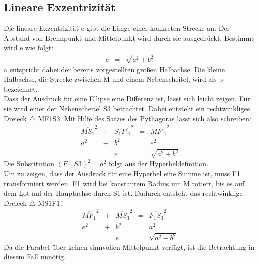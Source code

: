 \subsection{Lineare Exzentrizität}
Die lineare Exzentrizität e gibt die Länge einer konkreten Strecke an. Der Abstand von Brennpunkt und Mittelpunkt wird durch sie ausgedrückt. Bestimmt wird e wie folgt:
\begin{displaymath}
	\begin{array}{rcl}
		e & = & \sqrt{a^2\pm b^2}
	\end{array}
\end{displaymath}
a entspricht dabei der bereits vorgestellten großen Halbachse. Die kleine Halbachse, die Strecke zwischen M und einem Nebenscheitel, wird als b bezeichnet.\\
Dass der Ausdruck für eine Ellipse eine Differenz ist, lässt sich leicht zeigen. Für sie wird einer der Nebenscheitel S3 betrachtet. Dabei entsteht ein rechtwinkliges Dreieck $\triangle$ MF1S3. Mit Hilfe des Satzes des Pythagoras lässt sich also schreiben:
\begin{displaymath}
	\begin{array}{ccccl}
		\overline{M{S}_1}^2 & + & \overline{{S}_1{F'}_1}^2 & = & \overline{M{F'}_1}^2\\
		a^2 & + & b^2 & = & e^2\\
		&& e & = & \sqrt{a^2+b^2}
	\end{array}
\end{displaymath}
Die Substitution $(F1,S3)^2 = a^2$ folgt aus der Hyperbeldefinition.\\
Um zu zeigen, dass der Ausdruck für eine Hyperbel eine Summe ist, muss F1 transformiert werden. F1 wird bei konstantem Radius um M rotiert, bis es auf dem Lot auf der Hauptachse durch S1 ist. Dadurch entsteht das rechtwinklige Dreieck $\triangle$ MS1F1'.
\begin{displaymath}
	\begin{array}{ccccl}
		\overline{M{F}_1}^2 & + & \overline{M{S}_3}^2 & = & \overline{{F}_1{S}_3}^2\\
		e^2 & + & b^2 & = & a^2\\
		&& e & = & \sqrt{a^2-b^2}
	\end{array}
\end{displaymath}
Da die Parabel über keinen sinnvollen Mittelpunkt verfügt, ist die Betrachtung in diesem Fall unnötig.\\
